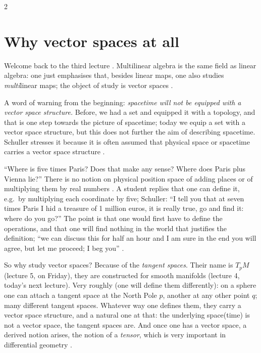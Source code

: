 \begin{paracol}{2}
\section{Why vector spaces at all}\label{sec:c03-why}

Welcome back to the third lecture . Multilinear algebra is the same field as linear algebra: one just emphasises that, besides linear maps, one also studies \emph{multi}linear maps; the object of study
is vector spaces .

A word of warning from the beginning: \emph{spacetime will not be equipped with a vector space structure.} Before, we had a set and equipped it with a topology, and that is one step towards the picture of spacetime;
today we equip a set with a vector space structure, but this does not further the aim of describing spacetime. Schuller stresses it because it is often assumed that physical space or spacetime carries a vector space structure
.
\begin{aside}
``Where is five times Paris? Does that make any sense? Where does Paris plus Vienna lie?'' There is no notion on physical position space of adding places or of multiplying them by real numbers
. A student replies that one can define it, e.g.\ by multiplying each coordinate by five; Schuller: ``I tell you that at seven times Paris I hid a treasure of 1 million euros, it is really true,
go and find it: where do you go?'' The point is that one would first have to define the operations, and that one will find nothing in the world that justifies the definition; ``we can discuss this for half an hour and
I am sure in the end you will agree, but let me proceed; I beg you'' .
\end{aside}

So why study vector spaces? Because of the \emph{tangent spaces}. Their name is $T_pM$ (lecture 5, on Friday), they are constructed for smooth manifolds (lecture 4, today's next lecture). Very roughly (one will define them differently):
on a sphere one can attach a tangent space at the North Pole $p$, another at any other point $q$; many different tangent spaces. Whatever way one defines them, they carry a vector space structure, and a natural one at that:
the underlying space(time) is not a vector space, the tangent spaces are. And once one has a vector space, a derived notion arises, the notion of a \emph{tensor}, which is very important in differential geometry
.


\end{paracol}
